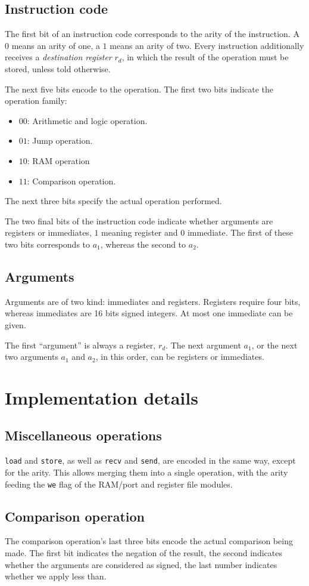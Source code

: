 \documentclass{scrartcl}
\begin{document}
\subsection*{Instruction code}
The first bit of an instruction code corresponds to the arity of the
instruction.
A $0$ means an arity of one, a $1$ means an arity of two. Every
instruction additionally receives a \emph{destination register} $r_d$,
in which the result of the operation must be stored, unless told
otherwise.\par
The next five bits encode to the operation. The first two bits indicate
the operation family:
\begin{itemize}
\item $00$: Arithmetic and logic operation.
\item $01$: Jump operation.
\item $10$: RAM operation
\item $11$: Comparison operation.
\end{itemize}
The next three bits specify the actual operation performed.\par
The two final bits of the instruction code indicate whether arguments are
registers or immediates, $1$ meaning register and $0$ immediate. The first of
these two bits corresponds to $a_1$, whereas the second to $a_2$.
\subsection*{Arguments}
Arguments are of two kind: immediates and registers. Registers require four bits,
whereas immediates are 16 bits signed integers. At most one immediate can be
given.\par
The first ``argument'' is always a register, $r_d$. The next argument $a_1$, or
the next two arguments $a_1$ and $a_2$, in this order, can be registers or
immediates.

\section*{Implementation details}
\subsection*{Miscellaneous operations}
\verb|load| and \verb|store|, as well as \verb|recv| and \verb|send|, are encoded
in the same way, except for the arity. This allows merging them into a single
operation, with the arity feeding the \verb|we| flag of the RAM/port and register
file modules.
\subsection*{Comparison operation}
The comparison operation's last three bits encode the actual comparison being made.
The first bit indicates the negation of the result, the second indicates whether
the arguments are considered as signed, the last number indicates whether we
apply less than.
\end{document}
